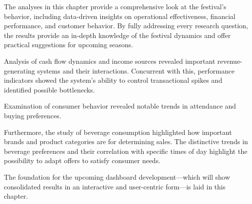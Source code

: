 The analyses in this chapter provide a comprehensive look at the festival's behavior, including data-driven insights on operational effectiveness, financial performance, and customer behavior.
By fully addressing every research question, the results provide an in-depth knowledge of the festival dynamics and offer practical suggestions for upcoming seasons.

Analysis of cash flow dynamics and income sources revealed important revenue-generating systems and their interactions.
Concurrent with this, performance indicators showed the system's ability to control transactional spikes and identified possible bottlenecks.

Examination of consumer behavior revealed notable trends in attendance and buying preferences.

Furthermore, the study of beverage consumption highlighted how important brands and product categories are for determining sales.
The distinctive trends in beverage preferences and their correlation with specific times of day highlight the possibility to adapt offers to satisfy consumer needs.

The foundation for the upcoming dashboard development—which will show consolidated results in an interactive and user-centric form—is laid in this chapter.

